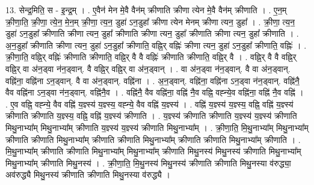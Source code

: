 \documentclass[17pt]{extarticle}
\begin{document}
13. सेन्द्र॒मिति॒ स - इ॒न्द्र॒म् । . ए॒वैन॑ मेन मे॒वै वैन॑म् क्रीणाति क्रीणा त्येन मे॒वै वैन॑म् क्रीणाति । . ए॒न॒म् क्री॒णा॒ति॒ क्री॒णा॒ त्ये॒न॒ मे॒न॒म् क्री॒णा॒ त्य॒न॒ डुहा॑ ऽन॒डुहा᳚ क्रीणा त्येन मेनम् क्रीणा त्यन॒ डुहा᳚ । . क्री॒णा॒ त्य॒न॒ डुहा॑ ऽन॒डुहा᳚ क्रीणाति क्रीणा त्यन॒ डुहा᳚ क्रीणाति क्रीणा त्यन॒ डुहा᳚ क्रीणाति क्रीणा त्यन॒ डुहा᳚ क्रीणाति । . अ॒न॒डुहा᳚ क्रीणाति क्रीणा त्यन॒ डुहा॑ ऽन॒डुहा᳚ क्रीणाति॒ वह्नि॒र् वह्निः॑ क्रीणा त्यन॒ डुहा॑ ऽन॒डुहा᳚ क्रीणाति॒ वह्निः॑ । . क्री॒णा॒ति॒ वह्नि॒र् वह्निः॑ क्रीणाति क्रीणाति॒ वह्नि॒र् वै वै वह्निः॑ क्रीणाति क्रीणाति॒ वह्नि॒र् वै । . वह्नि॒र् वै वै वह्नि॒र् वह्नि॒र् वा अ॑न॒ड्वा न॑न॒ड्वान्. वै वह्नि॒र् वह्नि॒र् वा अ॑न॒ड्वान् । . वा अ॑न॒ड्वा न॑न॒ड्वान्. वै वा अ॑न॒ड्वान्. वह्नि॑ना॒ वह्नि॑ना ऽन॒ड्वान्. वै वा अ॑न॒ड्वान्. वह्नि॑ना । . अ॒न॒ड्वान्. वह्नि॑ना॒ वह्नि॑ना ऽन॒ड्वा न॑न॒ड्वान्. वह्नि॑नै॒ वैव वह्नि॑ना ऽन॒ड्वा न॑न॒ड्वान्. वह्नि॑नै॒व । . वह्नि॑नै॒ वैव वह्नि॑ना॒ वह्नि॑ नै॒व वह्नि॒ वह्न्ये॒व वह्नि॑ना॒ वह्नि॑ नै॒व वह्नि॑ । . ए॒व वह्नि॒ वह्न्ये॒ वैव वह्नि॑ य॒ज्ञ्स्य॑ य॒ज्ञ्स्य॒ वह्न्ये॒ वैव वह्नि॑ य॒ज्ञ्स्य॑ । . वह्नि॑ य॒ज्ञ्स्य॑ य॒ज्ञ्स्य॒ वह्नि॒ वह्नि॑ य॒ज्ञ्स्य॑ क्रीणाति क्रीणाति य॒ज्ञ्स्य॒ वह्नि॒ वह्नि॑ य॒ज्ञ्स्य॑ क्रीणाति । . य॒ज्ञ्स्य॑ क्रीणाति क्रीणाति य॒ज्ञ्स्य॑ य॒ज्ञ्स्य॑ क्रीणाति मिथु॒नाभ्या᳚म् मिथु॒नाभ्या᳚म् क्रीणाति य॒ज्ञ्स्य॑ य॒ज्ञ्स्य॑ क्रीणाति मिथु॒नाभ्या᳚म् । . क्री॒णा॒ति॒ मि॒थु॒नाभ्या᳚म् मिथु॒नाभ्या᳚म् क्रीणाति क्रीणाति मिथु॒नाभ्या᳚म् क्रीणाति क्रीणाति मिथु॒नाभ्या᳚म् क्रीणाति क्रीणाति मिथु॒नाभ्या᳚म् क्रीणाति । . मि॒थु॒नाभ्या᳚म् क्रीणाति क्रीणाति मिथु॒नाभ्या᳚म् मिथु॒नाभ्या᳚म् क्रीणाति मिथु॒नस्य॑ मिथु॒नस्य॑ क्रीणाति मिथु॒नाभ्या᳚म् मिथु॒नाभ्या᳚म् क्रीणाति मिथु॒नस्य॑ । . क्री॒णा॒ति॒ मि॒थु॒नस्य॑ मिथु॒नस्य॑ क्रीणाति क्रीणाति मिथु॒नस्या व॑रुद्ध्या॒ अव॑रुद्ध्यै मिथु॒नस्य॑ क्रीणाति क्रीणाति मिथु॒नस्या व॑रुद्ध्यै । \newline
\end{document}

